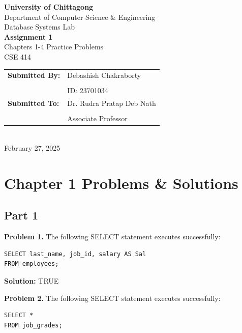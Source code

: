 \documentclass[12pt,a4paper]{article}
\begin{document}
\begin{titlepage}
    \centering
    \vspace*{2cm}
    {\Huge\bfseries University of Chittagong}\\[0.5cm]
    {\Large Department of Computer Science \& Engineering}\\[0.5cm]
    {\large Database Systems Lab}\\[2cm]
    
    {\huge\bfseries Assignment 1}\\[0.5cm]
    {\LARGE Chapters 1-4 Practice Problems}\\[0.5cm]
    {\large CSE 414}\\[3cm]
    
    \begin{tabular}{ll}
        \Large \textbf{Submitted By:} & \Large Debashish Chakraborty\\\\
        & \Large ID: 23701034\\[2cm]
        \Large \textbf{Submitted To:} & \Large Dr. Rudra Pratap Deb Nath\\\\
        & \Large Associate Professor\\
    \end{tabular}\\[4cm]
    
    {\large February 27, 2025}
\end{titlepage}

\newpage
\tableofcontents
\newpage

\section{Chapter 1 Problems \& Solutions}

\subsection{Part 1}

\textbf{Problem 1.} The following SELECT statement executes successfully:
\begin{lstlisting}[style=sqlstyle]
SELECT last_name, job_id, salary AS Sal
FROM employees;
\end{lstlisting}

\textbf{Solution:} TRUE

\vspace{0.5cm}

\textbf{Problem 2.} The following SELECT statement executes successfully:
\begin{lstlisting}[style=sqlstyle]
SELECT *
FROM job_grades;
\end{lstlisting}
\end{document}

